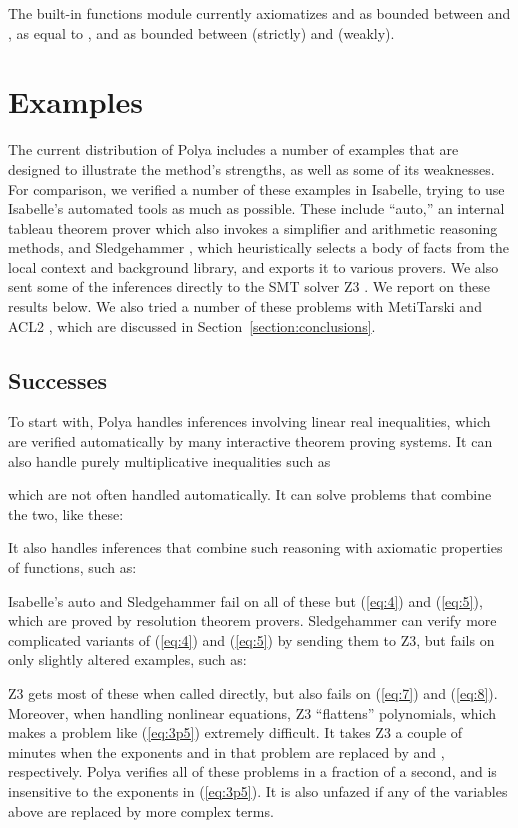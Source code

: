 \documentclass[runningheds]{llncs}
\begin{document}
The built-in functions module currently axiomatizes  and  as bounded between  and ,  as equal to , and  as bounded between  (strictly) and  (weakly).

\section{Examples}
\label{section:examples}

The current distribution of Polya includes a number of examples that are designed to illustrate the method's strengths, as well as some of its weaknesses. For comparison, we verified a number of these examples in Isabelle, trying to use Isabelle's automated tools as much as possible. These include ``auto,'' an internal tableau theorem prover which also invokes a simplifier and arithmetic reasoning methods, and Sledgehammer  \cite{meng:paulson:09} \cite{blanchette:et:al:11}, which heuristically selects a body of facts from the local context and background library, and exports it to various provers. We also sent some of the inferences directly to the SMT solver Z3 \cite{demoura:bjorner:08}. We report on these results below. We also tried a number of these problems with MetiTarski \cite{akbarpour:paulson:08} and ACL2 \cite{acl2}, which are discussed in Section~\ref{section:conclusions}.


\subsection{Successes}
\label{subsection:successes}

To start with, Polya handles inferences involving linear real inequalities, which are verified automatically by many interactive theorem proving systems. It can also handle purely multiplicative inequalities such as

which are not often handled automatically. It can solve problems that combine the two, like these:

It also handles inferences that combine such reasoning with axiomatic properties of functions, such as: 
 
Isabelle's auto and Sledgehammer fail on all of these but (\ref{eq:4}) and (\ref{eq:5}), which are proved by resolution theorem provers. Sledgehammer can verify more complicated variants of (\ref{eq:4}) and (\ref{eq:5}) by sending them to Z3, but fails on only slightly altered examples, such as:

Z3 gets most of these when called directly, but also fails on (\ref{eq:7}) and (\ref{eq:8}). Moreover, when handling nonlinear equations, Z3 ``flattens'' polynomials, which makes a problem like (\ref{eq:3p5}) extremely difficult. It takes Z3 a couple of minutes when the exponents  and  in that problem are replaced by  and , respectively. Polya verifies all of these problems in a fraction of a second, and is insensitive to the exponents in (\ref{eq:3p5}). It is also unfazed if any of the variables above are replaced by more complex terms.
\end{document}
